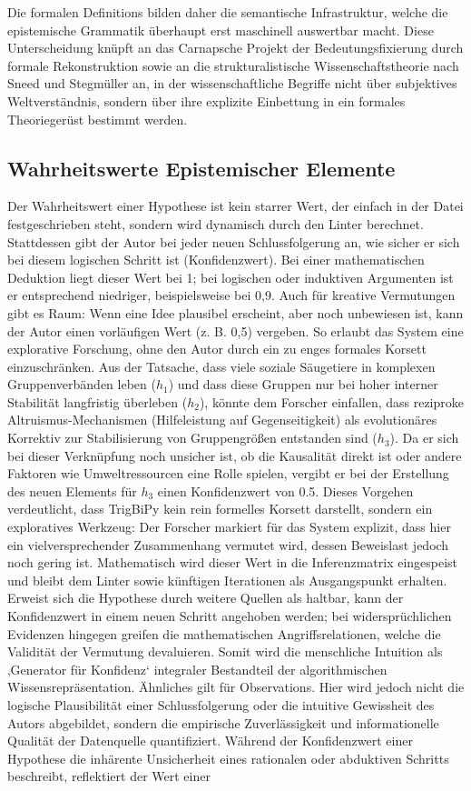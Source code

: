 \documentclass[11pt, a4paper]{article}
\begin{document}
	Die formalen Definitions bilden daher die semantische Infrastruktur, welche die epistemische Grammatik überhaupt erst maschinell auswertbar macht. Diese Unterscheidung knüpft an das Carnapsche Projekt der Bedeutungsfixierung durch formale Rekonstruktion sowie an die strukturalistische Wissenschaftstheorie nach Sneed und Stegmüller an, in der wissenschaftliche Begriffe nicht über subjektives Weltverständnis, sondern über ihre explizite Einbettung in ein formales Theoriegerüst bestimmt werden.
	
	\subsection{Wahrheitswerte Epistemischer Elemente} Der Wahrheitswert einer Hypothese ist kein starrer Wert, der einfach in der Datei festgeschrieben steht, sondern wird dynamisch durch den Linter berechnet. Stattdessen gibt der Autor bei jeder neuen Schlussfolgerung an, wie sicher er sich bei diesem logischen Schritt ist (Konfidenzwert). Bei einer mathematischen Deduktion liegt dieser Wert bei 1; bei logischen oder induktiven Argumenten ist er entsprechend niedriger, beispielsweise bei 0,9. Auch für kreative Vermutungen gibt es Raum: Wenn eine Idee plausibel erscheint, aber noch unbewiesen ist, kann der Autor einen vorläufigen Wert (z. B. 0,5) vergeben. So erlaubt das System eine explorative Forschung, ohne den Autor durch ein zu enges formales Korsett einzuschränken. Aus der Tatsache, dass viele soziale Säugetiere in komplexen Gruppenverbänden leben ($h_1$) und dass diese Gruppen nur bei hoher interner Stabilität langfristig überleben ($h_2$), könnte dem Forscher einfallen, dass reziproke Altruismus-Mechanismen (Hilfeleistung auf Gegenseitigkeit) als evolutionäres Korrektiv zur Stabilisierung von Gruppengrößen entstanden sind ($h_3$). Da er sich bei dieser Verknüpfung noch unsicher ist, ob die Kausalität direkt ist oder andere Faktoren wie Umweltressourcen eine Rolle spielen, vergibt er bei der Erstellung des neuen Elements für $h_3$ einen Konfidenzwert von 0.5. Dieses Vorgehen verdeutlicht, dass TrigBiPy kein rein formelles Korsett darstellt, sondern ein exploratives Werkzeug: Der Forscher markiert für das System explizit, dass hier ein vielversprechender Zusammenhang vermutet wird, dessen Beweislast jedoch noch gering ist. Mathematisch wird dieser Wert in die Inferenzmatrix eingespeist und bleibt dem Linter sowie künftigen Iterationen als Ausgangspunkt erhalten. Erweist sich die Hypothese durch weitere Quellen als haltbar, kann der Konfidenzwert in einem neuen Schritt angehoben werden; bei widersprüchlichen Evidenzen hingegen greifen die mathematischen Angriffsrelationen, welche die Validität der Vermutung devaluieren. Somit wird die menschliche Intuition als ‚Generator für Konfidenz‘ integraler Bestandteil der algorithmischen Wissensrepräsentation. Ähnliches gilt für Observations. Hier wird jedoch nicht die logische Plausibilität einer Schlussfolgerung oder die intuitive Gewissheit des Autors abgebildet, sondern die empirische Zuverlässigkeit und informationelle Qualität der Datenquelle quantifiziert. Während der Konfidenzwert einer Hypothese die inhärente Unsicherheit eines rationalen oder abduktiven Schritts beschreibt, reflektiert der Wert einer 
\end{document}
